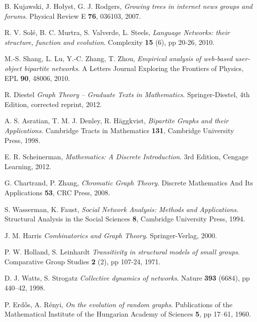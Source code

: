 \cleardoublepage
{}
{}
\begin{thebibliography}{99}

  B. Kujawski, J. Hołyst, G. J. Rodgers,
  \emph{Growing trees in internet news groups and forums}.
  Physical Review E \textbf{76}, 036103,
  2007.

  R. V. Solé, B. C. Murtra, S. Valverde, L. Steels,
  \emph{Language Networks: their structure, function and evolution}.
  Complexity \textbf{15} (6), pp 20-26,
  2010.

  M.-S. Shang, L. Lu, Y.-C. Zhang, T. Zhou,
  \emph{Empirical analysis of web-based user-object bipartite networks}.
  A Letters Journal Exploring the Frontiers of Physics, EPL \textbf{90}, 48006,
  2010.

  R. Diestel
  \emph{Graph Theory -- Graduate Texts in Mathematics}.
  Springer-Diestel,
  4th Edition, corrected reprint,
  2012.

  A. S. Asratian, T. M. J. Denley, R. Häggkvist,
  \emph{Bipartite Graphs and their Applications}.
  Cambridge Tracts in Mathematics \textbf{131},
  Cambridge University Press,
  1998.

  E. R. Scheinerman, 
  \emph{Mathematics: A Discrete Introduction}.
  3rd Edition,
  Cengage Learning,
  2012.

  G. Chartrand, P. Zhang,
  \emph{Chromatic Graph Theory}.
  Discrete Mathematics And Its Applications \textbf{53},
  CRC Press,
  2008.

  S. Wasserman, K. Faust,
  \emph{Social Network Analysis: Methods and Applications}.
  Structural Analysis in the Social Sciences \textbf{8},
  Cambridge University Press,
  1994.

  J. M. Harris
  \emph{Combinatorics and Graph Theory}.
  Springer-Verlag,
  2000.
  
  P. W. Holland, S. Leinhardt
  \emph{Transitivity in structural models of small groups}.
  Comparative Group Studies \textbf{2} (2), pp 107-24,
  1971.

  D. J. Watts, S. Strogatz
  \emph{Collective dynamics of  networks}.
  Nature \textbf{393} (6684), pp 440–42,
  1998.

  P. Erdős, A. Rényi,
  \emph{On the evolution of random graphs}.
  Publications of the Mathematical Institute of the Hungarian Academy of Sciences \textbf{5}, pp 17–61,
  1960.


\end{thebibliography}
